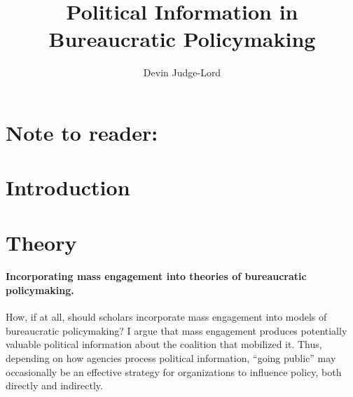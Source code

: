 \documentclass{article}
\title{Political Information in Bureaucratic Policymaking}
\author{Devin Judge-Lord} %
\begin{document}
\maketitle
\abstract{}















\newpage
\tableofcontents

\newpage
\section*{Note to reader:}


\doublespace
% 

\newpage
\section{Introduction} \label{intro}


\section{Theory} 
\paragraph{Incorporating mass engagement into theories of bureaucratic policymaking.}
How, if at all, should scholars incorporate mass engagement into models of bureaucratic policymaking? 
I argue that mass engagement produces potentially valuable political information about the coalition that mobilized it.
Thus, depending on how agencies process political information, ``going public'' may occasionally be an effective strategy for organizations to influence policy, both directly and indirectly.
\end{document}
